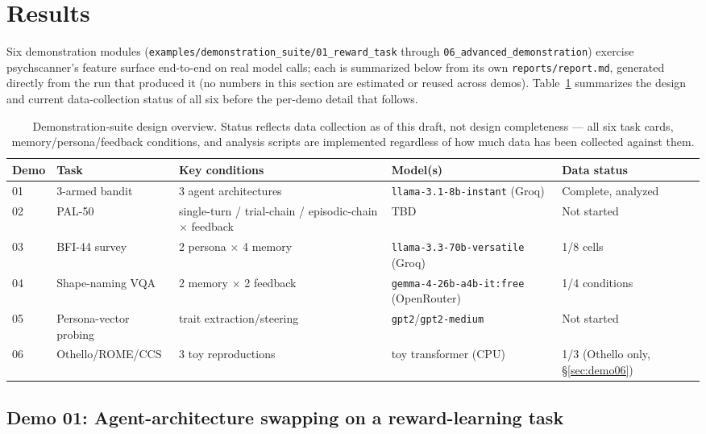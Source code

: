 \documentclass[11pt]{article}
\begin{document}
\section{Results}
\label{sec:results}

Six demonstration modules (\texttt{examples/demonstration\_suite/01\_reward\_task} through
\texttt{06\_advanced\_demonstration}) exercise psychscanner's feature surface
end-to-end on real model calls; each is summarized below from its own
\texttt{reports/report.md}, generated directly from the run that produced it
(no numbers in this section are estimated or reused across demos).
Table~\ref{tab:demo-overview} summarizes the design and current data-collection
status of all six before the per-demo detail that follows.

\begin{table}[h]
\centering
\caption{Demonstration-suite design overview. Status reflects data
collection as of this draft, not design completeness — all six task cards,
memory/persona/feedback conditions, and analysis scripts are implemented
regardless of how much data has been collected against them.}
\label{tab:demo-overview}
\small
\begin{tabular}{@{}p{}p{}p{}p{}p{}@{}}
\toprule
Demo & Task & Key conditions & Model(s) & Data status \\
\midrule
01 & 3-armed bandit & 3 agent architectures & \texttt{llama-3.1-8b-instant} (Groq) & Complete, analyzed \\
02 & PAL-50 & single-turn / trial-chain / episodic-chain $\times$ feedback & TBD & Not started \\
03 & BFI-44 survey & 2 persona $\times$ 4 memory & \texttt{llama-3.3-70b-versatile} (Groq) & 1/8 cells \\
04 & Shape-naming VQA & 2 memory $\times$ 2 feedback & \texttt{gemma-4-26b-a4b-it:free} (OpenRouter) & 1/4 conditions \\
05 & Persona-vector probing & trait extraction/steering & \texttt{gpt2}/\texttt{gpt2-medium} & Not started \\
06 & Othello/ROME/CCS & 3 toy reproductions & toy transformer (CPU) & 1/3 (Othello only, \S\ref{sec:demo06}) \\
\bottomrule
\end{tabular}
\end{table}

\subsection{Demo 01: Agent-architecture swapping on a reward-learning task}
\label{sec:demo01}
\end{document}
